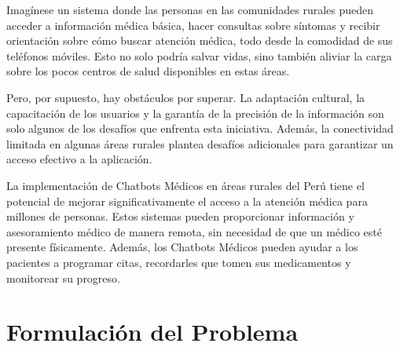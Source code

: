 Imagínese un sistema donde las personas en las comunidades rurales pueden acceder a información médica básica, hacer consultas sobre síntomas y recibir orientación sobre cómo buscar atención médica, todo desde la comodidad de sus teléfonos móviles. Esto no solo podría salvar vidas, sino también aliviar la carga sobre los pocos centros de salud disponibles en estas áreas.

Pero, por supuesto, hay obstáculos por superar. La adaptación cultural, la capacitación de los usuarios y la garantía de la precisión de la información son solo algunos de los desafíos que enfrenta esta iniciativa. Además, la conectividad limitada en algunas áreas rurales plantea desafíos adicionales para garantizar un acceso efectivo a la aplicación.

La implementación de Chatbots Médicos en áreas rurales del Perú tiene el potencial de mejorar significativamente el acceso a la atención médica para millones de personas. Estos sistemas pueden proporcionar información y asesoramiento médico de manera remota, sin necesidad de que un médico esté presente físicamente. Además, los Chatbots Médicos pueden ayudar a los pacientes a programar citas, recordarles que tomen sus medicamentos y monitorear su progreso. 



\section{Formulación del Problema}



